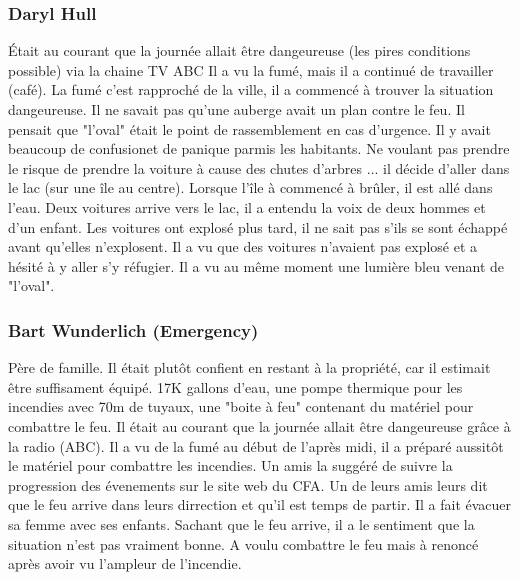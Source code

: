             \subsubsection{Daryl Hull}
                Était au courant que la journée allait être dangeureuse (les pires conditions possible) via la chaine TV ABC
                Il a vu la fumé, mais il a continué de travailler (café).
                La fumé c'est rapproché de la ville, il a commencé à trouver la situation dangeureuse.
                Il ne savait pas qu'une auberge avait un plan contre le feu.
                Il pensait que "l'oval" était le point de rassemblement en cas d'urgence.
                Il y avait beaucoup de confusionet de panique parmis les habitants.
                Ne voulant pas prendre le risque de prendre la voiture à cause des chutes d'arbres ... il décide d'aller dans le lac
                (sur une île au centre).
                Lorsque l'île à commencé à brûler, il est allé dans l'eau.
                Deux voitures arrive vers le lac, il a entendu la voix de deux hommes et d'un enfant.
                Les voitures ont explosé plus tard, il ne sait pas s'ils se sont échappé avant qu'elles n'explosent.
                Il a vu que des voitures n'avaient pas explosé et a hésité à y aller s'y réfugier.
                Il a vu au même moment une lumière bleu venant de "l'oval".

            \subsubsection{Bart Wunderlich (Emergency)}
                Père de famille.
                Il était plutôt confient en restant à la propriété, car il estimait être suffisament équipé.
                17K gallons d'eau, une pompe thermique pour les incendies avec 70m de tuyaux, une "boite à feu" contenant du matériel
                pour combattre le feu.
                Il était au courant que la journée allait être dangeureuse grâce à la radio (ABC).
                Il a vu de la fumé au début de l'après midi, il a préparé aussitôt le matériel pour combattre les incendies.
                Un amis la suggéré de suivre la progression des évenements sur le site web du CFA.
                Un de leurs amis leurs dit que le feu arrive dans leurs dirrection et qu'il est temps de partir.
                Il a fait évacuer sa femme avec ses enfants.
                Sachant que le feu arrive, il a le sentiment que la situation n'est pas vraiment bonne.
                A voulu combattre le feu mais à renoncé après avoir vu l'ampleur de l'incendie.

